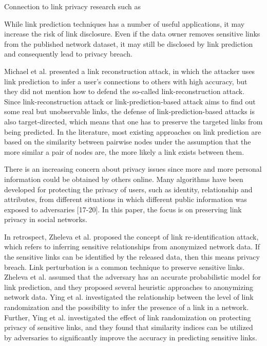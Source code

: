 Connection to link privacy research such as \cite{amin:wwwj}

While link prediction techniques has a number of useful applications, it may increase the risk of link disclosure. Even if the data owner removes sensitive links from the published network dataset, it may still be disclosed by link prediction and consequently lead to privacy breach. 

Michael et al. \cite{fire2013links} presented a link reconstruction attack, in which the attacker uses link prediction to infer a user's connections to others with high accuracy, but they did not mention how to defend the so-called link-reconstruction attack. Since link-reconstruction attack or link-prediction-based attack aims to find out some real but unobservable links, the defense of link-prediction-based attacks is also target-directed, which means that one has to preserve the targeted links from being predicted. In the literature, most existing approaches on link prediction are based on the similarity between pairwise nodes under the assumption that the more similar a pair of nodes are, the more likely a link exists between them.

There is an increasing concern about privacy issues since more and more personal information could be obtained by others online. Many algorithms have been developed for protecting the privacy of users, such as identity, relationship and attributes, from different situations in which different public information was exposed to adversaries [17-20]. In this paper, the focus is on preserving link privacy in social networks.

In retrospect, Zheleva et al. \cite{zheleva2008preserving} proposed the concept of link re-identification attack, which refers to inferring sensitive relationships from anonymized network data. If the sensitive links can be identified by the released data, then this means privacy breach. Link perturbation is a common technique to preserve sensitive links. Zheleva et al. \cite{zheleva2008preserving} assumed that the adversary has an accurate probabilistic model for link prediction, and they proposed several heuristic approaches to anonymizing network data. Ying et al. \cite{ying2008randomizing} investigated the relationship between the level of link randomization and the possibility to infer the presence of a link in a network. Further, Ying et al. \cite{ying2009link} investigated the effect of link randomization on protecting privacy of sensitive links, and they found that similarity indices can be utilized by adversaries to significantly improve the accuracy in predicting sensitive links.

